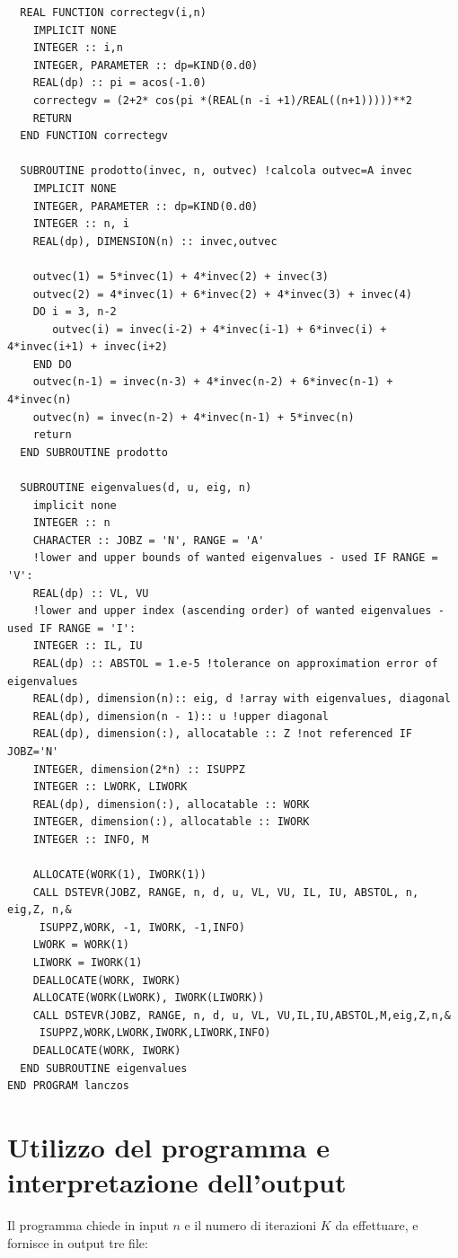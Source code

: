 \documentclass[11pt]{article}
\numberwithin{equation}{subsection}
\theoremstyle{connome}
\theoremstyle{connomesenzanumero}
\theoremstyle{connome+}
\theoremstyle{connomesenzanumero+}
\begin{document}
\begin{verbatim}
  REAL FUNCTION correctegv(i,n)
    IMPLICIT NONE
    INTEGER :: i,n
    INTEGER, PARAMETER :: dp=KIND(0.d0)
    REAL(dp) :: pi = acos(-1.0)
    correctegv = (2+2* cos(pi *(REAL(n -i +1)/REAL((n+1)))))**2
    RETURN
  END FUNCTION correctegv

  SUBROUTINE prodotto(invec, n, outvec) !calcola outvec=A invec
    IMPLICIT NONE
    INTEGER, PARAMETER :: dp=KIND(0.d0)
    INTEGER :: n, i
    REAL(dp), DIMENSION(n) :: invec,outvec

    outvec(1) = 5*invec(1) + 4*invec(2) + invec(3)
    outvec(2) = 4*invec(1) + 6*invec(2) + 4*invec(3) + invec(4)
    DO i = 3, n-2
       outvec(i) = invec(i-2) + 4*invec(i-1) + 6*invec(i) + 4*invec(i+1) + invec(i+2)
    END DO
    outvec(n-1) = invec(n-3) + 4*invec(n-2) + 6*invec(n-1) + 4*invec(n)
    outvec(n) = invec(n-2) + 4*invec(n-1) + 5*invec(n)
    return
  END SUBROUTINE prodotto

  SUBROUTINE eigenvalues(d, u, eig, n)
    implicit none
    INTEGER :: n
    CHARACTER :: JOBZ = 'N', RANGE = 'A'
    !lower and upper bounds of wanted eigenvalues - used IF RANGE = 'V':
    REAL(dp) :: VL, VU 
    !lower and upper index (ascending order) of wanted eigenvalues - used IF RANGE = 'I':
    INTEGER :: IL, IU 
    REAL(dp) :: ABSTOL = 1.e-5 !tolerance on approximation error of eigenvalues
    REAL(dp), dimension(n):: eig, d !array with eigenvalues, diagonal
    REAL(dp), dimension(n - 1):: u !upper diagonal
    REAL(dp), dimension(:), allocatable :: Z !not referenced IF JOBZ='N'
    INTEGER, dimension(2*n) :: ISUPPZ
    INTEGER :: LWORK, LIWORK
    REAL(dp), dimension(:), allocatable :: WORK
    INTEGER, dimension(:), allocatable :: IWORK
    INTEGER :: INFO, M

    ALLOCATE(WORK(1), IWORK(1))
    CALL DSTEVR(JOBZ, RANGE, n, d, u, VL, VU, IL, IU, ABSTOL, n, eig,Z, n,&
	 ISUPPZ,WORK, -1, IWORK, -1,INFO)
    LWORK = WORK(1)
    LIWORK = IWORK(1)
    DEALLOCATE(WORK, IWORK)
    ALLOCATE(WORK(LWORK), IWORK(LIWORK))
    CALL DSTEVR(JOBZ, RANGE, n, d, u, VL, VU,IL,IU,ABSTOL,M,eig,Z,n,&
	 ISUPPZ,WORK,LWORK,IWORK,LIWORK,INFO)
    DEALLOCATE(WORK, IWORK)
  END SUBROUTINE eigenvalues
END PROGRAM lanczos
\end{verbatim}
\section{Utilizzo del programma e interpretazione dell'output}
\label{sec-3}
Il programma chiede in input $n$ e il numero di iterazioni $K$ da effettuare, e fornisce in output tre file:
\end{document}
